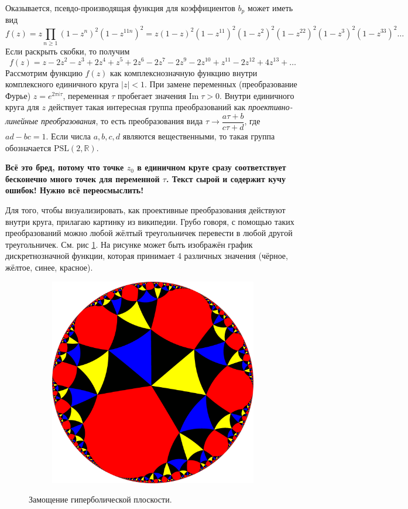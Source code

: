 \documentclass{article}
\theoremstyle{definition}
\newtheorem*{theorem}{Теорема}
\begin{document}
Оказывается, псевдо-производящая функция для коэффициентов \( b_p \) может иметь вид
\[
	f(z) = z\prod_{n \geq 1}(1 - z^{n})^2(1 - z^{11 n})^{2} = 
	z(1 - z)^2(1 - z^{11})^{2}(1 - z^2)^2(1 - z^{22})^{2}(1 - z^3)^2(1 - 
	z^{33})^{2} \ldots
\]
Если раскрыть скобки, то получим
\[
	f(z) = z - 2z^2 - z^3 + 2z^4 + z^5 + 2z^6 - 2z^7 - 2z^9 - 2z^{10} + z^{11} 
	- 
	2z^{12} + 4z^{13} + \ldots
\]
Рассмотрим функцию \( f(z) \) как комплекснозначную функцию внутри комплексного единичного круга \( {|z| < 1} \). При замене переменных (преобразование Фурье) \( z = e^{2 \pi i \tau} \), переменная \( \tau \) пробегает значения \( \mathrm{Im}\; \tau > 0 \). Внутри единичного круга для \( z \) действует такая интересная группа преобразований как \textit{проективно-линейные преобразования}, то есть преобразования вида \( \tau \to \dfrac{a \tau + b}{c\tau + d} \), где \( ad - bc = 1 \). Если числа \( a, b, c, d \) являются вещественными, то такая группа обозначается \( \mathrm{PSL}(2, \mathbb R) \).

\textbf{Всё это бред, потому что точке \( z_0 \) в единичном круге сразу соответствует бесконечно много точек для переменной \( \tau \). Текст сырой и содержит кучу ошибок! Нужно всё переосмыслить!}


Для того, чтобы визуализировать, как проективные преобразования действуют внутри круга, прилагаю картинку из википедии. Грубо говоря, с помощью таких преобразований можно любой жёлтый треугольничек перевести в любой другой треугольничек. См. рис \ref{fig:projective}. На рисунке может быть изображён график дискретнозначной функции, которая принимает 4 различных значения (чёрное, жёлтое, синее, красное).

\begin{figure}[h]
\centering
\begin{subfigure}{.8\textwidth}
	\centering
	\includegraphics[width=.5\textwidth]{projective.png}
\end{subfigure}%
\caption{Замощение гиперболической плоскости.}
\label{fig:projective}	
\end{figure}
\end{document}
